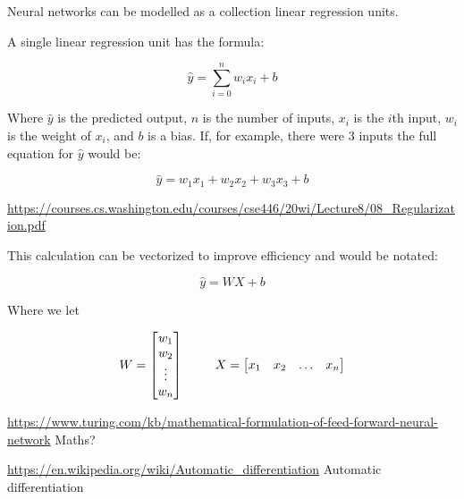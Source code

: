\documentclass{article}
\begin{document}
    Neural networks can be modelled as a collection linear regression units.

    A single linear regression unit has the formula:

    \begin{displaymath}
        \hat{y} = \sum_{i=0}^{n} w_ix_i + b
    \end{displaymath}

    Where $\hat{y}$ is the predicted output, $n$ is the number of inputs, $x_i$ is the $i$th input, $w_i$ is the weight of $x_i$, and $b$ is a bias.
    If, for example, there were 3 inputs the full equation for $\hat{y}$ would be:
    
    \begin{displaymath}
        \hat{y} = w_1x_1 + w_2x_2 + w_3x_3 + b
    \end{displaymath}

    \noindent \url{https://courses.cs.washington.edu/courses/cse446/20wi/Lecture8/08_Regularization.pdf}

    This calculation can be vectorized to improve efficiency and would be notated:

    \begin{displaymath}
        \hat{y} = WX + b
    \end{displaymath}

    Where we let

    \begin{displaymath}
        W = \begin{bmatrix}
            w_1\\
            w_2\\
            \vdots\\
            w_n
        \end{bmatrix}\\
        \hspace{25px}
        X = \begin{bmatrix}
            x_1&
            x_2&
            \hdots&
            x_n
        \end{bmatrix}
    \end{displaymath}





    

    \noindent \url{https://www.turing.com/kb/mathematical-formulation-of-feed-forward-neural-network} Maths?

    \noindent \url{https://en.wikipedia.org/wiki/Automatic_differentiation} Automatic differentiation

    
    
\end{document}

